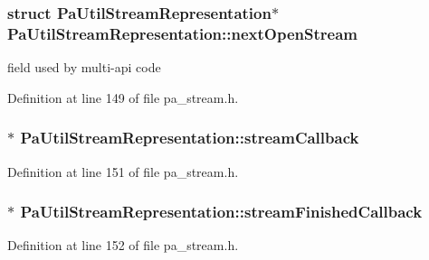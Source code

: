 \subsubsection[{\texorpdfstring{next\+Open\+Stream}{nextOpenStream}}]{\setlength{\rightskip}{0pt plus 5cm}struct {\bf Pa\+Util\+Stream\+Representation}$\ast$ Pa\+Util\+Stream\+Representation\+::next\+Open\+Stream}\hypertarget{struct_pa_util_stream_representation_ab920ec2330973059213cf785f1132e28}{}\label{struct_pa_util_stream_representation_ab920ec2330973059213cf785f1132e28}
field used by multi-\/api code 

Definition at line 149 of file pa\+\_\+stream.\+h.

\subsubsection[{\texorpdfstring{stream\+Callback}{streamCallback}}]{$\ast$ Pa\+Util\+Stream\+Representation\+::stream\+Callback}\hypertarget{struct_pa_util_stream_representation_a87c11103277fc073b4f2ab82e30d48d9}{}\label{struct_pa_util_stream_representation_a87c11103277fc073b4f2ab82e30d48d9}


Definition at line 151 of file pa\+\_\+stream.\+h.

\subsubsection[{\texorpdfstring{stream\+Finished\+Callback}{streamFinishedCallback}}]{$\ast$ Pa\+Util\+Stream\+Representation\+::stream\+Finished\+Callback}\hypertarget{struct_pa_util_stream_representation_a9132c3be1600907f747c38d64f4a4a3e}{}\label{struct_pa_util_stream_representation_a9132c3be1600907f747c38d64f4a4a3e}


Definition at line 152 of file pa\+\_\+stream.\+h.

